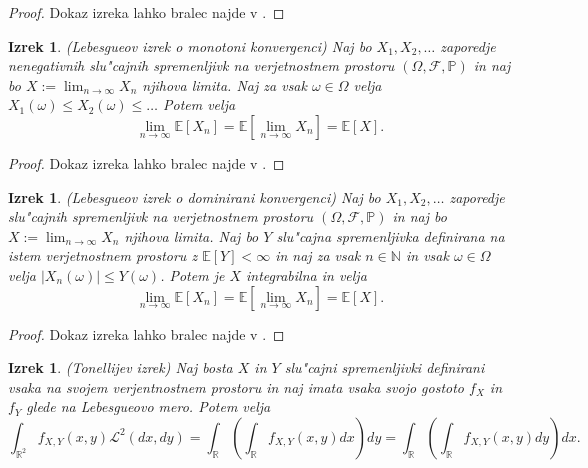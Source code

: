 \documentclass[12pt, a4paper, reqno]{amsart}
\theoremstyle{definition}
\theoremstyle{plain}
\newtheorem{izrek}[definicija]{Izrek}
\newcommand{\R}{\mathbb{R}}
\newcommand{\N}{\mathbb{N}}
\newcommand{\E}{\mathbb{E}}
\newcommand{\Prob}{\mathbb{P}}
\newcommand{\1}{\mathds{1}}
\begin{document}
    \begin{proof}
        Dokaz izreka lahko bralec najde v \cite{7}.
    \end{proof}

    \begin{izrek}(Lebesgueov izrek o monotoni konvergenci)
        Naj bo $X_1, X_2, \dots $ zaporedje nenegativnih slu"cajnih spremenljivk na 
        verjetnostnem prostoru $(\Omega, \mathcal{F}, \Prob)$ in naj bo $X:= \lim_{n\to\infty}X_n$ 
        njihova limita. Naj za vsak $\omega \in \Omega$
        velja $X_1(\omega) \leq X_2(\omega) \leq \dots$ Potem velja 
        \begin{equation*}
            \lim_{n\to\infty}\E\left[X_n\right] = \E\left[\lim_{n\to\infty}X_n\right] = \E\left[X\right].
        \end{equation*}
        \label{izr:monotonaKonvergenca}
    \end{izrek}

    \begin{proof}
        Dokaz izreka lahko bralec najde v \cite{7}.
    \end{proof}  

    \begin{izrek}(Lebesgueov izrek o dominirani konvergenci)
        Naj bo $X_1, X_2, \dots $ zaporedje slu"cajnih spremenljivk na verjetnostnem prostoru
        $(\Omega, \mathcal{F}, \Prob)$ in naj bo $X:= \lim_{n\to\infty}X_n$ njihova limita.
        Naj bo $Y$ slu"cajna spremenljivka definirana na istem verjetnostnem prostoru z $\E\left[Y\right]<\infty$ in
        naj za vsak $n\in\N$ in vsak $\omega\in\Omega$ velja $|X_n(\omega)| \leq Y(\omega)$. Potem je $X$ integrabilna
        in velja 
        \begin{equation*}
            \lim_{n\to\infty}\E\left[X_n\right] = \E\left[\lim_{n\to\infty}X_n\right] = \E\left[X\right].
        \end{equation*}
        \label{izr:dominiranaKonvergenca}
    \end{izrek}

    \begin{proof}
        Dokaz izreka lahko bralec najde v \cite{7}.
    \end{proof}

    \begin{izrek}(Tonellijev izrek)
        Naj bosta $X$ in $Y$ slu"cajni spremenljivki definirani vsaka na svojem verjentnostnem prostoru
        in naj imata vsaka svojo gostoto $f_X$ in $f_Y$ glede na Lebesgueovo mero.
        Potem velja
        \begin{equation*}
            \int_{\R^2}f_{X, Y}(x, y)\mathcal{L}^2(dx, dy) 
            = \int_{\R}\left(\int_{\R}f_{X, Y}(x, y)dx\right)dy = \int_{\R}\left(\int_{\R}f_{X, Y}(x, y)dy\right)dx.
        \end{equation*}
        \label{izr:TonellijevIzrek}
    \end{izrek}
\end{document}
